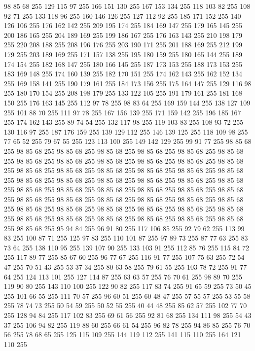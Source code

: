 98 85 68 255 129 115 97 255 166 151 130 255 167 153 134 255 118 103 82 255 108 92 71 255 133 118 96 255 160 146 126 255 127 112 92 255 185 171 152 255 140 126 106 255 176 162 142 255 209 195 174 255 184 169 147 255 179 165 145 255 200 186 165 255 204 189 169 255 199 186 167 255 176 163 143 255 210 198 179 255 220 208 188 255 208 196 176 255 203 190 171 255 201 188 169 255 212 199 179 255 203 189 169 255 171 157 138 255 195 180 159 255 180 165 144 255 189 174 154 255 182 168 147 255 180 166 145 255 187 173 153 255 188 173 153 255 183 169 148 255 174 160 139 255 182 170 151 255 174 162 143 255 162 152 134 255 169 158 141 255 190 179 161 255 184 173 156 255 175 164 147 255 129 116 98 255 180 170 154 255 208 198 179 255 133 122 105 255 191 179 161 255 181 168 150 255 176 163 145 255 112 97 78 255 98 83 64 255 169 159 144 255 138 127 109 255 101 88 70 255 111 97 78 255 167 156 139 255 171 159 142 255 196 185 167 255 174 162 143 255 89 74 54 255 132 117 98 255 119 103 83 255 108 93 72 255
130 116 97 255 187 176 159 255 139 129 112 255 146 139 125 255 118 109 98 255 77 65 52 255 79 67 55 255 123 113 100 255 149 142 129 255 99 91 77 255 98 85 68 255 98 85 68 255 98 85 68 255 98 85 68 255 98 85 68 255 98 85 68 255 98 85 68 255 98 85 68 255 98 85 68 255 98 85 68 255 98 85 68 255 98 85 68 255 98 85 68 255 98 85 68 255 98 85 68 255 98 85 68 255 98 85 68 255 98 85 68 255 98 85 68 255 98 85 68 255 98 85 68 255 98 85 68 255 98 85 68 255 98 85 68 255 98 85 68 255 98 85 68 255 98 85 68 255 98 85 68 255 98 85 68 255 98 85 68 255 98 85 68 255 98 85 68 255 98 85 68 255 98 85 68 255 98 85 68 255 98 85 68 255 98 85 68 255 98 85 68 255 98 85 68 255 98 85 68 255 98 85 68 255 98 85 68 255 98 85 68 255 98 85 68 255 98 85 68 255 98 85 68 255 98 85 68 255 98 85 68 255 98 85 68 255 98 85 68 255 95 94 84 255 96 91 80 255 117 106 85 255 92 79 62 255
113 99 83 255 100 87 71 255 125 97 83 255 110 101 87 255 97 89 73 255 87 77 63 255 83 73 64 255 138 110 95 255 139 107 90 255 133 103 91 255 112 85 76 255 115 84 72 255 117 89 77 255 85 67 60 255 96 77 67 255 116 91 77 255 107 75 63 255 72 54 47 255 70 51 43 255 53 37 34 255 80 63 58 255 79 61 55 255 103 78 72 255 91 77 64 255 124 113 101 255 127 114 87 255 63 63 57 255 76 70 61 255 98 89 70 255 119 90 80 255 143 110 100 255 122 90 82 255 117 83 74 255 91 65 59 255 73 50 45 255 101 66 55 255 111 70 57 255 96 60 51 255 60 48 47 255 57 55 57 255 53 55 58 255 78 74 73 255 50 54 59 255 50 52 55 255 40 44 48 255 85 62 57 255 102 77 70 255 128 94 84 255 117 102 83 255 69 61 56 255 92 81 68 255 134 111 98 255 54 43 37 255 106 94 82 255 119 88 60 255 66 61 54 255 96 82 78 255 94 86 85 255 76 70 56 255 78 68 65 255 125 115 109 255 144 119 112 255 141 115 110 255 164 121 110 255
